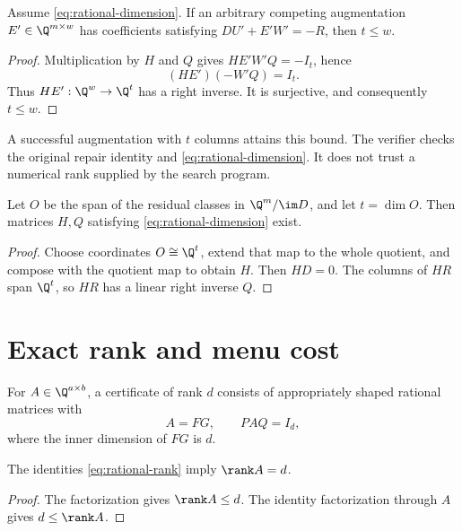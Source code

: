 \begin{theorem}\label{thm:rational-lower}
Assume \eqref{eq:rational-dimension}. If an arbitrary competing augmentation $E'\in\Q^{m\times w}$ has coefficients satisfying $DU'+E'W'=-R$, then $t\leq w$.
\end{theorem}
\begin{proof}
Multiplication by $H$ and $Q$ gives $HE'W'Q=-I_t$, hence
\[
 (HE')(-W'Q)=I_t.
\]
Thus $HE':\Q^w\to\Q^t$ has a right inverse. It is surjective, and consequently $t\leq w$.
\end{proof}

A successful augmentation with $t$ columns attains this bound. The verifier checks the original repair identity and \eqref{eq:rational-dimension}. It does not trust a numerical rank supplied by the search program.

\begin{proposition}
Let $O$ be the span of the residual classes in $\Q^m/\im D$, and let $t=\dim O$. Then matrices $H,Q$ satisfying \eqref{eq:rational-dimension} exist.
\end{proposition}
\begin{proof}
Choose coordinates $O\cong\Q^t$, extend that map to the whole quotient, and compose with the quotient map to obtain $H$. Then $HD=0$. The columns of $HR$ span $\Q^t$, so $HR$ has a linear right inverse $Q$.
\end{proof}

\section{Exact rank and menu cost}
For $A\in\Q^{a\times b}$, a certificate of rank $d$ consists of appropriately shaped rational matrices with
\begin{equation}\label{eq:rational-rank}
 A=FG,\qquad PAQ=I_d,
\end{equation}
where the inner dimension of $FG$ is $d$.

\begin{proposition}
The identities \eqref{eq:rational-rank} imply $\rank A=d$.
\end{proposition}
\begin{proof}
The factorization gives $\rank A\leq d$. The identity factorization through $A$ gives $d\leq\rank A$.
\end{proof}

